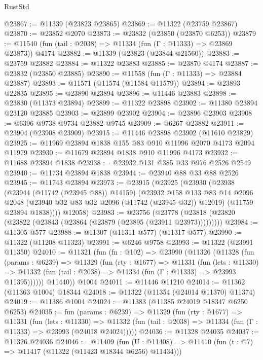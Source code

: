 \begin{lexlean}{RustStd}
\begin{coremodule}
@23867 := @11339 (@23823 @23865)
@23869 := @11322 (@23759 @23867)
@23870 := @23852 @2070
@23873 := @23832 (@23850 (@23870 @6253))
@23879 := @11540 (fun (tail : @2038) => @11334 (fun (Γ : @11333) => @23869 @23873)) @4174
@23882 := @11339 (@23823 (@23844 @21560))
@23883 := @23759 @23882
@23884 := @11322 @23883
@23885 := @23870 @4174
@23887 := @23832 (@23850 @23885)
@23890 := @11558 (fun (Γ : @11333) => @23884 @23887)
@23893 := @11571 (@11574 (@11584 @11579))
@23894 := @23893 @22835
@23895 := @23890 @23894
@23896 := @11446 @23883
@23898 := @23830 (@11373 @23894)
@23899 := @11322 @23898
@23902 := @11380 @23894 @23120 @23885
@23903 := @23899 @23902
@23904 := @23896 @23903
@23908 := @6396 @9738 @9734 @23882 @9745
@23909 := @6267 @23882
@23911 := @23904 (@23908 @23909)
@23915 := @11446 @23898 @23902 (@11610 @23829)
@23925 := @11969 @23894 @1838 @155 @83 @910 @11996 @2070 @4173 @2094 @11979
@23930 := @11679 @23894 @1838 @910 @11996 @4173
@23932 := @11688 @23894 @1838
@23938 := @23932 @131 @385 @33 @976 @2526 @2549
@23940 := @11734 @23894 @1838
@23944 := @23940 @88 @33 @88 @2526
@23945 := @11743 @23894
@23973 := @23915
    (@23925
      (@23930
        (@23938
          (@23944 (@11742 (@23945 @88)) @14159)
          (@23932
            @158
            @133
            @83
            @14
            @2096
            @2048
            (@23940 @32 @83 @32 @2096 (@11742 (@23945 @32)) @12019)
            (@11759 @23894 @1838))))
      @12058)
@23983 := @23756
    (@23778 (@23818 (@23820 (@23822 (@23843 (@23864 (@23879 (@23895 (@23911 @23973)))))))))
@23984 := @11305 @577
@23988 := @11307 (@11311 @577) (@11317 @577)
@23990 := @11322 (@11208 @11323)
@23991 := @6246 @9758
@23993 := @11322 (@23991 @11350)
@24010 := @11321
    (fun (fn : @102) =>
    @23990
      (@11326
        (@11328
          (fun (params : @6239) =>
          @11329
            (fun (rty : @1677) =>
            @11331
              (fun (lets : @11330) =>
              @11332 (fun (tail : @2038) => @11334 (fun (Γ : @11333) => @23993 @11395))))))
        @11440))
    @1004
@24011 := @11446 @11210
@24014 := @11362 (@11363 @1004) @18344
@24018 := @11322 (@11354 (@24014 @11370) @11374)
@24019 := @11386 @1004
@24024 := @11383 (@11385 @24019 @18347 @6250 @6253)
@24035 := fun (params : @6239) =>
  @11329
    (fun (rty : @1677) =>
    @11331
      (fun (lets : @11330) =>
      @11332 (fun (tail : @2038) => @11334 (fun (Γ : @11333) => @23993 (@24018 @24024)))))
@24036 := @11328 @24035
@24037 := @11326 @24036
@24046 := @11409
    (fun (U : @11408) => @11410 (fun (t : @7) => @11417 (@11322 (@11423 @18344 @6256) @11434)))

\end{coremodule}
\end{lexlean}
